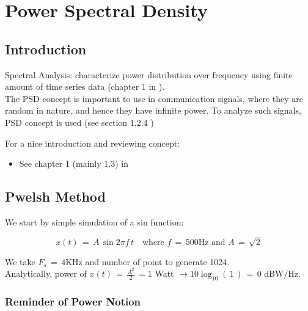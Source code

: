 

\chapter{Power Spectral Density}

\section{Introduction}

Spectral Analysis: characterize power distribution over frequency using finite amount of time series data (chapter 1 in \cite{book_Spectral_Analysis_Stoica}).\\

The PSD concept is important to use in communication signals, where they are random in nature, and hence they have infinite power. To analyze such signals, PSD concept is used (see section 1.2.4 \cite{books_digital_comm_fundamentals_Sklar})

For a nice introduction and reviewing concept:\\

\begin{itemize}
    \item See chapter 1 (mainly 1.3) in \cite{book_Spectral_Analysis_Stoica}

\end{itemize}

\section{Pwelsh Method}

We start by simple simulation of a sin function:

\begin{equation}
    x(t) \, = \, A \, \sin{2 \pi f \, t} \quad \text{where } f \, = \, 500 \text{Hz and } A \, = \, \sqrt{2}
\end{equation}

We take $F_s \, = \, 4$KHz and number of point to generate 1024.\\

Analytically, power of $x(t) \, = \, \displaystyle\frac{A^2}{2} \, = 1$ Watt $\rightarrow 10 \log_{10} (\, 1\, ) \, = \, 0$ dBW/Hz.

\subsection{Reminder of Power Notion}


